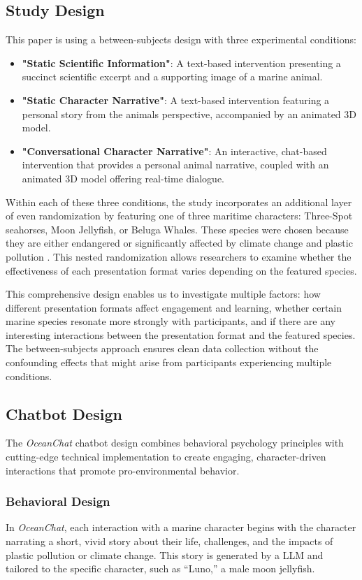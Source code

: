 \documentclass[sigconf, nonacm]{acmart}
\begin{document}
\subsection{Study Design} 
This paper is using a between-subjects design with three experimental conditions:
\begin{itemize}
    \item \textbf{"Static Scientific Information"}: A text-based intervention presenting a succinct scientific excerpt and a supporting image of a marine animal.
    \item \textbf{"Static Character Narrative"}: A text-based intervention featuring a personal story from the animals perspective, accompanied by an animated 3D model.
    \item \textbf{"Conversational Character Narrative"}: An interactive, chat-based intervention that provides a personal animal narrative, coupled with an animated 3D model offering real-time dialogue.
\end{itemize}


Within each of these three conditions, the study incorporates an additional layer of even randomization by featuring one of three maritime characters: Three-Spot seahorses, Moon Jellyfish, or Beluga Whales. These species were chosen because they are either endangered or significantly affected by climate change and plastic pollution \cite{Rapp2021, Williams2021, Dong2018}. This nested randomization allows researchers to examine whether the effectiveness of each presentation format varies depending on the featured species.

This comprehensive design enables us to investigate multiple factors: how different presentation formats affect engagement and learning, whether certain marine species resonate more strongly with participants, and if there are any interesting interactions between the presentation format and the featured species. The between-subjects approach ensures clean data collection without the confounding effects that might arise from participants experiencing multiple conditions.

\subsection{Chatbot Design}
The \textit{OceanChat} chatbot design combines behavioral psychology principles with cutting-edge technical implementation to create engaging, character-driven interactions that promote pro-environmental behavior.
\subsubsection{Behavioral Design}
In \textit{OceanChat}, each interaction with a marine character begins with the character narrating a short, vivid story about their life, challenges, and the impacts of plastic pollution or climate change. This story is generated by a LLM and tailored to the specific character, such as “Luno,” a male moon jellyfish.
\end{document}
